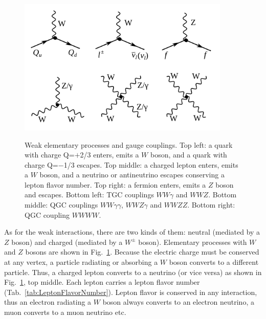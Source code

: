 \begin{figure}[htb]
  \begin{center}
    {\includegraphics[width=0.90\textwidth]{../figs/Intro/feynmW.png}}
    \caption{Weak elementary processes and gauge couplings. Top left: a quark with charge Q=$+$2/3 enters, emits a $W$ boson, and a quark with charge Q=$-$1/3 escapes. Top middle: a charged lepton enters, emits a $W$ boson, and a neutrino or antineutrino escapes conserving a lepton flavor number. Top right: a fermion enters, emits a $Z$ boson and escapes. Bottom left: TGC couplings $WW\gamma$ and $WWZ$. Bottom middle: QGC couplings $WW\gamma\gamma$, $WWZ\gamma$ and $WWZZ$. Bottom right: QGC coupling $WWWW$.}
    \label{fig:feynmW}
  \end{center}
\end{figure}

As for the weak interactions, there are two kinds of them: neutral (mediated by a $Z$ boson) and charged (mediated by a $W^\pm$ boson). Elementary processes with $W$ and $Z$ bosons are shown in Fig.~\ref{fig:feynmW}. Because the electric charge must be conserved at any vertex, a particle radiating or absorbing a $W$ boson converts to a different particle. Thus, a charged lepton converts to a neutrino (or vice versa) as shown in Fig.~\ref{fig:feynmW}, top middle. Each lepton carries a lepton flavor number (Tab.~\ref{tab:LeptonFlavorNumber}). Lepton flavor is conserved in any interaction, thus an electron radiating a $W$ boson  always converts to an electron neutrino, a muon converts to a muon neutrino etc.


